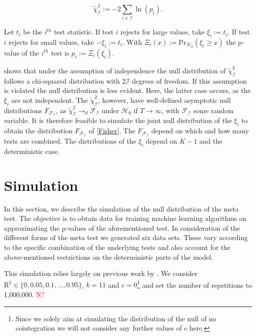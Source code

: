 \documentclass[12pt,a4paper]{article}
\let\rmarkdownfootnote\footnote%
\def\footnote{\protect\rmarkdownfootnote}
\begin{document}
\begin{equation}
\tilde{\chi}^2_{\mathcal{I}} := -2 \sum_{i \in \mathcal{I}} \ln{(p_i)}. 
\label{Fisher}
\end{equation}

Let \(t_i\) be the \(i^{th}\) test statistic. If test \(i\) rejects for
large values, take \(\xi_i := t_i\). If test \(i\) rejects for small
values, take \(-\xi_i := t_i\). With
\(\Xi_i(x) := \text{Pr}_{\mathcal{H_0}}(\xi_i \geq x)\) the p-value of
the \(i^{th}\) test is \(p_i := \Xi_i(\xi_i)\).

\textcite{Fisher_1932} shows that under the assumption of independence
the null distribution of \(\tilde{\chi}^2_{\mathcal{I}}\) follows a
chi-squared distribution with \(2\mathcal{I}\) degrees of freedom. If
this assumption is violated the null distribution is less evident. Here,
the latter case occurs, as the \(\xi_i\) are not independent. The
\(\tilde{\chi}^2_{\mathcal{I}}\), however, have well-defined asymptotic
null distributions \(F_{\mathcal{F_I}}\), as
\(\tilde{\chi}^2_{\mathcal{I}} \rightarrow_d \mathcal{F_I}\) under
\(\mathcal{H}_0\) if \(T \rightarrow \infty\), with \(\mathcal{F_I}\)
some random variable. It is therefore feasible to simulate the joint
null distribution of the \(\xi_i\) to obtain the distribution
\(F_{\mathcal{F_I}}\) of \ref{Fisher}. The \(F_{\mathcal{F_I}}\) depend
on which and how many tests are combined. The distributions of the
\(\xi_i\) depend on \(K-1\) and the deterministic case.

\hypertarget{simulation}{%
\section{Simulation}\label{simulation}}

In this section, we describe the simulation of the null distribution of
the meta test. The objective is to obtain data for training machine
learning algorithms on approximating the p-values of the aforementioned
test. In consideration of the different forms of the meta test we
generated six data sets. These vary according to the specific
combination of the underlying tests and also account for the
above-mentioned restrictions on the deterministic parts of the model.

This simulation relies largely on previous work by
\textcite{Pesavento_2004}. We consider
\(\text{R}^2 \in \{0, 0.05, 0.1, ..., 0.95\}\), \(k = 11\) and
\(c = 0\)\footnote{Since we solely aim at simulating the distribution of
  the null of no cointegration we will not consider any further values
  of \(c\) here.} and set the number of repetitions to 1,000,000.
\textcolor{red}{N?}
\end{document}
